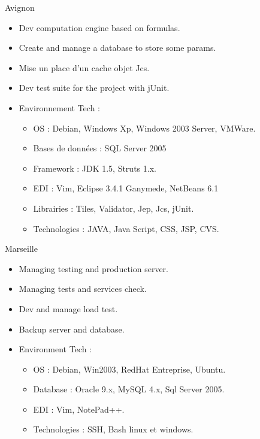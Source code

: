 \documentclass[10pt,a4paper,sans]{moderncv}
\begin{document}
\vskip 1cm

{Avignon}{
  \begin{itemize}%
    \item Dev computation engine based on formulas.
    \item Create and manage a database to store some params.
    \item Mise un place d'un cache objet Jcs.
    \item Dev test suite for the project with jUnit.
    \item Environnement Tech :
      \begin{itemize}%
        \item OS : Debian, Windows Xp, Windows 2003 Server, VMWare.
        \item Bases de données : SQL Server 2005
        \item Framework : JDK 1.5,  Struts 1.x.
        \item EDI : Vim, Eclipse 3.4.1 Ganymede, NetBeans 6.1
        \item Librairies : Tiles, Validator, Jep, Jcs, jUnit.
        \item Technologies : JAVA, Java Script, CSS, JSP, CVS.
      \end{itemize}
  \end{itemize}}

\vskip 1cm
{Marseille}{
  \begin{itemize}%
    \item Managing testing and production server.
    \item Managing tests and services check.
    \item Dev and manage load test.
    \item Backup server and database.
    \item Environment Tech :
      \begin{itemize}%
        \item OS : Debian, Win2003, RedHat Entreprise, Ubuntu.
        \item Database : Oracle 9.x, MySQL 4.x, Sql Server 2005.
        \item EDI : Vim, NotePad++.
        \item Technologies : SSH, Bash linux et windows.
      \end{itemize}
  \end{itemize}}
\end{document}
